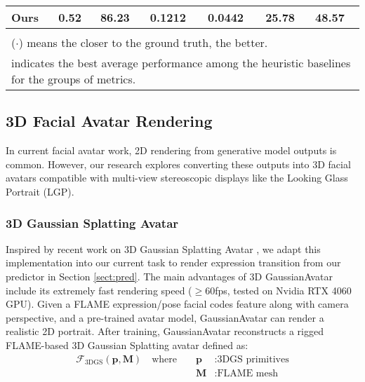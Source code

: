 \documentclass[a4paper,twocolumn]{article}
\begin{document}
\begin{table*}[!t]
\begin{tabular}{lllllll}
\rowcolor[rgb]{0.855,0.91,0.988} \textbf{Ours} & \textbf{0.52}                & 86.23                          & \textbf{0.1212}             & \textbf{0.0442}             & \textbf{25.78}                & 48.57            \\ 
\bottomrule
                                               &                              &                                &                             &                             &                               &                           \\
\multicolumn{7}{l}{($\cdot$) means the closer to the ground truth, the better.}                                                                                                                                                        \\
\multicolumn{7}{l}{indicates the best average performance among the heuristic baselines for the groups of metrics.}                                                                                                                   
\end{tabular}
\label{tab:resulttable}
\end{table*}

\subsection{3D Facial Avatar Rendering}

In current facial avatar work, 2D rendering from generative model outputs is common. However, our research explores converting these outputs into 3D facial avatars compatible with multi-view stereoscopic displays like the Looking Glass Portrait (LGP).

\subsubsection{3D Gaussian Splatting Avatar}

Inspired by recent work on 3D Gaussian Splatting Avatar \cite{qian2023gaussianavatars}, we adapt this implementation into our current task to render expression transition from our predictor in Section \ref{sect:pred}. The main advantages of 3D GaussianAvatar include its extremely fast rendering speed ($\ge 60$fps, tested on Nvidia RTX 4060 GPU). Given a FLAME expression/pose facial codes feature along with camera perspective, and a pre-trained avatar model, GaussianAvatar can render a realistic 2D portrait. After training, GaussianAvatar reconstructs a rigged FLAME-based 3D Gaussian Splatting avatar \cite{qian2023gaussianavatars} defined as:
\begin{align}
\mathcal{F}_{\text{3DGS}}(\mathbf{p}, \mathbf{M})\quad\textrm{where } &&\mathbf{p}&: \textrm{3DGS primitives}\\
&&\mathbf{M}&: \textrm{FLAME mesh}
\end{align}
\end{document}

